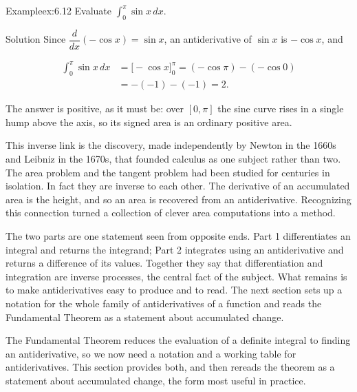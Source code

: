 \documentclass[a4paper,12pt,oneside]{memoir}
\begin{document}
\begin{workedexample}
\begin{envexample}{Example}{ex:6.12}{}
Evaluate \(\displaystyle\int_{0}^{\pi} \sin x\,dx\).
\end{envexample}
\begin{envsolution}{Solution}{}{}
Since \(\dfrac{d}{dx}(-\cos x) = \sin x\), an antiderivative of \(\sin x\) is \(-\cos x\), and

\[ \begin{aligned}
          \int_{0}^{\pi} \sin x\,dx &= \bigl[-\cos x\bigr]_{0}^{\pi}
                                     = (-\cos \pi) - (-\cos 0) \\[2pt]
                                    &= -(-1) - (-1) = 2.
        \end{aligned} \]

The answer is positive, as it must be: over \([0, \pi]\) the sine curve rises in a single hump above the axis, so its signed area is an ordinary positive area. \qedmark
\end{envsolution}
\end{workedexample}
This inverse link is the discovery, made independently by Newton in the 1660s and Leibniz in the 1670s, that founded calculus as one subject rather than two. The area problem and the tangent problem had been studied for centuries in isolation. In fact they are inverse to each other. The derivative of an accumulated area is the height, and so an area is recovered from an antiderivative. Recognizing this connection turned a collection of clever area computations into a method.

The two parts are one statement seen from opposite ends. Part 1 differentiates an integral and returns the integrand; Part 2 integrates using an antiderivative and returns a difference of its values. Together they say that differentiation and integration are inverse processes, the central fact of the subject. What remains is to make antiderivatives easy to produce and to read. The next section sets up a notation for the whole family of antiderivatives of a function and reads the Fundamental Theorem as a statement about accumulated change.


The Fundamental Theorem reduces the evaluation of a definite integral to finding an antiderivative, so we now need a notation and a working table for antiderivatives. This section provides both, and then rereads the theorem as a statement about accumulated change, the form most useful in practice.
\end{document}
